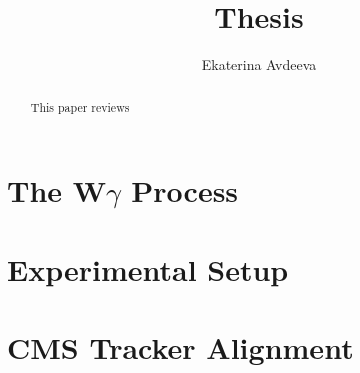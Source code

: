 \documentclass{article}
\begin{document}
 
\pagenumbering{}
\title{\textbf{Thesis}}

\author{Ekaterina Avdeeva}

\maketitle

\begin{abstract}
This paper reviews
\end{abstract}




\pagestyle{fancy}
\fancyhf{}
\lhead[]{\thepage}
\rhead[\thepage]{}

\tableofcontents

%








\section{The W$\gamma$ Process} %
\label{sec:WgAbout}




\section{Experimental Setup} %
\label{sec:Exp}
%
%

\section{CMS Tracker Alignment} %
\label{sec:alignment}
%
%
%

%
%
%
%
%
%
%




\end{document}
